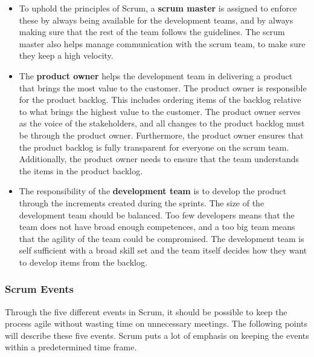 \begin{itemize}
\item To uphold the principles of Scrum, a \textbf{scrum master} is assigned to enforce these by always being available for the development teams, and by always making sure that the rest of the team follows the guidelines. The scrum master also helps manage communication with the scrum team, to make sure they keep a high velocity.

\item The \textbf{product owner} helps the development team in delivering a product that brings the most value to the customer. The product owner is responsible for the product backlog. This includes ordering items of the backlog relative to what brings the highest value to the customer. The product owner serves as the voice of the stakeholders, and all changes to the product backlog must be through the product owner.
Furthermore, the product owner ensures that the product backlog is fully transparent for everyone on the scrum team. Additionally, the product owner needs to ensure that the team understands the items in the product backlog.

\item The responsibility of the \textbf{development team} is to develop the product through the increments created during the sprints. 
The size of the development team should be balanced. Too few developers means that the team does not have broad enough competences, and a too big team means that the agility of the team could be compromised.
The development team is self sufficient with a broad skill set and the team itself decides how they want to develop items from the backlog.
\end{itemize}

\subsubsection{Scrum Events}
Through the five different events in Scrum, it should be possible to keep the process agile without wasting time on unnecessary meetings. The following points will describe these five events. Scrum puts a lot of emphasis on keeping the events within a predetermined time frame. 

